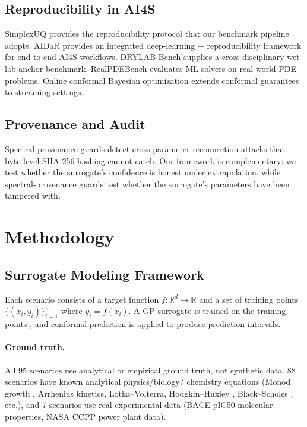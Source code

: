 \documentclass[journal]{IEEEtran}
\begin{document}
\subsection{Reproducibility in AI4S}

SimplexUQ \cite{simplexuq2026} provides the reproducibility protocol that our
benchmark pipeline adopts. AIDaR \cite{aidar2026} provides an integrated
deep-learning + reproducibility framework for end-to-end AI4S workflows.
DRYLAB-Bench \cite{drylabbench2026} supplies a cross-disciplinary wet-lab
anchor benchmark. RealPDEBench \cite{realpdebench2026} evaluates ML solvers
on real-world PDE problems. Online conformal Bayesian optimization
\cite{onlineconfbo2026} extends conformal guarantees to streaming settings.

\subsection{Provenance and Audit}

Spectral-provenance guards \cite{provenance2026attack} detect cross-parameter
reconnection attacks that byte-level SHA-256 hashing cannot catch. Our
framework is complementary: we test whether the surrogate's confidence is
honest under extrapolation, while spectral-provenance guards test whether the
surrogate's parameters have been tampered with.

\section{Methodology}
\label{sec:method}

\subsection{Surrogate Modeling Framework}

Each scenario consists of a target function $f: \mathbb{R}^d \to \mathbb{R}$
and a set of training points $\{(x_i, y_i)\}_{i=1}^n$ where $y_i = f(x_i)$.
A GP surrogate \cite{rasmussen2006gplm} is trained on the training points
\cite{forrester2008surrogate}, and conformal prediction is applied to produce
prediction intervals.

\paragraph{Ground truth.} All 95 scenarios use analytical or empirical ground
truth, not synthetic data. 88 scenarios have known analytical physics/biology/
chemistry equations (Monod growth \cite{monod1949growth}, Arrhenius kinetics,
Lotka--Volterra, Hodgkin--Huxley \cite{hodgkin1952nerve}, Black--Scholes
\cite{black1973options}, etc.), and 7 scenarios use real experimental data
(BACE pIC50 molecular properties, NASA CCPP power plant data).
\end{document}
